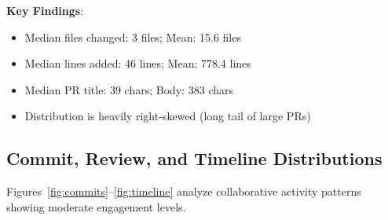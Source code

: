 \documentclass[11pt]{article}
\begin{document}
\textbf{Key Findings}: 
\begin{itemize}
    \item Median files changed: 3 files; Mean: 15.6 files
    \item Median lines added: 46 lines; Mean: 778.4 lines
    \item Median PR title: 39 chars; Body: 383 chars
    \item Distribution is heavily right-skewed (long tail of large PRs)
\end{itemize}

\subsection{Commit, Review, and Timeline Distributions}

Figures~\ref{fig:commits}--\ref{fig:timeline} analyze collaborative activity patterns showing moderate engagement levels.
\end{document}
